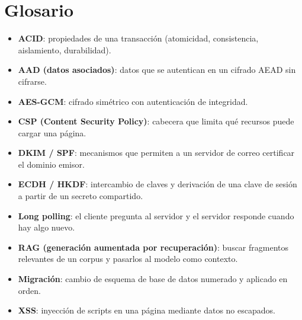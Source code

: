 \chapter{Glosario}\label{glosario}

\begin{itemize}
\tightlist
\item
  \textbf{ACID}: propiedades de una transacción (atomicidad, consistencia, aislamiento, durabilidad).
\item
  \textbf{AAD (datos asociados)}: datos que se autentican en un cifrado AEAD sin cifrarse.
\item
  \textbf{AES-GCM}: cifrado simétrico con autenticación de integridad.
\item
  \textbf{CSP (Content Security Policy)}: cabecera que limita qué recursos puede cargar una página.
\item
  \textbf{DKIM / SPF}: mecanismos que permiten a un servidor de correo certificar el dominio emisor.
\item
  \textbf{ECDH / HKDF}: intercambio de claves y derivación de una clave de sesión a partir de un secreto compartido.
\item
  \textbf{Long polling}: el cliente pregunta al servidor y el servidor responde cuando hay algo nuevo.
\item
  \textbf{RAG (generación aumentada por recuperación)}: buscar fragmentos relevantes de un corpus y pasarlos al modelo como contexto.
\item
  \textbf{Migración}: cambio de esquema de base de datos numerado y aplicado en orden.
\item
  \textbf{XSS}: inyección de scripts en una página mediante datos no escapados.
\end{itemize}
